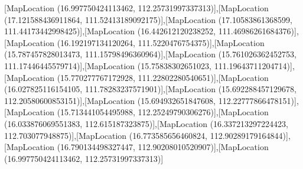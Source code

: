 [MapLocation (16.997750424113462, 112.25731997337313)],[MapLocation (17.121588436911864, 111.52413189092175)],[MapLocation (17.10583861368599, 111.44173442998425)],[MapLocation (16.442612120238252, 111.46986261684376)],[MapLocation (16.192197134120264, 111.5220476754375)],[MapLocation (15.787457828013473, 111.15798496360964)],[MapLocation (15.761026362452753, 111.17446445579714)],[MapLocation (15.75838302651023, 111.19643711204714)],[MapLocation (15.770277767172928, 111.22802280540651)],[MapLocation (16.027825116154105, 111.78283237571901)],[MapLocation (15.692288457129678, 112.20580600853151)],[MapLocation (15.694932651847608, 112.22777866478151)],[MapLocation (15.713441054495988, 112.25249790306276)],[MapLocation (16.033876069551383, 112.615187323875)],[MapLocation (16.337213297224423, 112.703077948875)],[MapLocation (16.773585656460824, 112.90289179164844)],[MapLocation (16.790134498327447, 112.90208010520907)],[MapLocation (16.997750424113462, 112.25731997337313)]